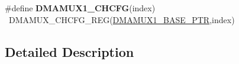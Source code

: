 \begin{DoxyCompactItemize}
\item 
\hypertarget{group___d_m_a_m_u_x___register___accessor___macros_ga4abeb744e9590ba9f382023427320873}{}\#define {\bfseries D\+M\+A\+M\+U\+X1\+\_\+\+C\+H\+C\+F\+G}(index)                                      ~D\+M\+A\+M\+U\+X\+\_\+\+C\+H\+C\+F\+G\+\_\+\+R\+E\+G(\hyperlink{group___d_m_a_m_u_x___peripheral_gad6b43366c6448bd157f17be565d8e1f3}{D\+M\+A\+M\+U\+X1\+\_\+\+B\+A\+S\+E\+\_\+\+P\+T\+R},index)\label{group___d_m_a_m_u_x___register___accessor___macros_ga4abeb744e9590ba9f382023427320873}

\end{DoxyCompactItemize}


\subsection{Detailed Description}
